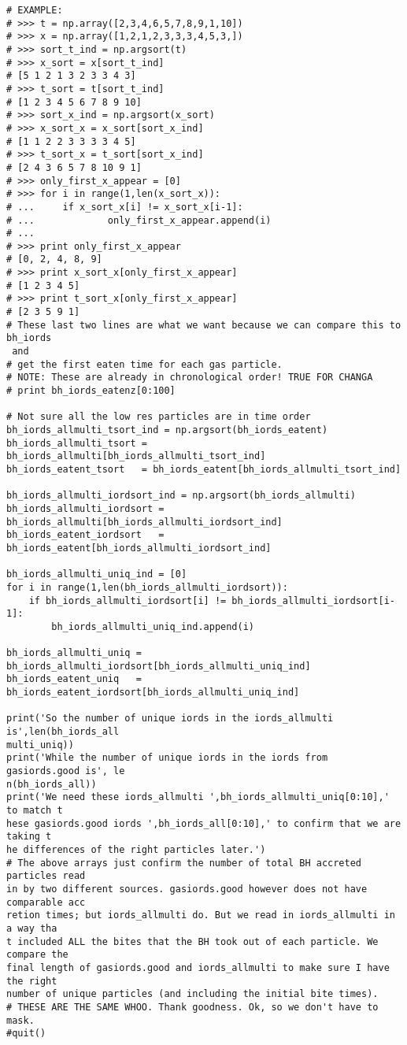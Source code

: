 \documentclass[12pt,headA,chapB]{fiskthesis}
\begin{document}
\begin{verbatim}
# EXAMPLE:
# >>> t = np.array([2,3,4,6,5,7,8,9,1,10])
# >>> x = np.array([1,2,1,2,3,3,3,4,5,3,])
# >>> sort_t_ind = np.argsort(t)
# >>> x_sort = x[sort_t_ind]
# [5 1 2 1 3 2 3 3 4 3]
# >>> t_sort = t[sort_t_ind]
# [1 2 3 4 5 6 7 8 9 10]
# >>> sort_x_ind = np.argsort(x_sort)
# >>> x_sort_x = x_sort[sort_x_ind]
# [1 1 2 2 3 3 3 3 4 5]
# >>> t_sort_x = t_sort[sort_x_ind]
# [2 4 3 6 5 7 8 10 9 1]
# >>> only_first_x_appear = [0]
# >>> for i in range(1,len(x_sort_x)):
# ...     if x_sort_x[i] != x_sort_x[i-1]:
# ...             only_first_x_appear.append(i)
# ... 
# >>> print only_first_x_appear
# [0, 2, 4, 8, 9]
# >>> print x_sort_x[only_first_x_appear]
# [1 2 3 4 5]
# >>> print t_sort_x[only_first_x_appear]
# [2 3 5 9 1]
# These last two lines are what we want because we can compare this to bh_iords
 and 
# get the first eaten time for each gas particle.
# NOTE: These are already in chronological order! TRUE FOR CHANGA
# print bh_iords_eatenz[0:100]

# Not sure all the low res particles are in time order
bh_iords_allmulti_tsort_ind = np.argsort(bh_iords_eatent)
bh_iords_allmulti_tsort = bh_iords_allmulti[bh_iords_allmulti_tsort_ind]
bh_iords_eatent_tsort   = bh_iords_eatent[bh_iords_allmulti_tsort_ind]

bh_iords_allmulti_iordsort_ind = np.argsort(bh_iords_allmulti)
bh_iords_allmulti_iordsort = bh_iords_allmulti[bh_iords_allmulti_iordsort_ind]
bh_iords_eatent_iordsort   = bh_iords_eatent[bh_iords_allmulti_iordsort_ind]

bh_iords_allmulti_uniq_ind = [0]
for i in range(1,len(bh_iords_allmulti_iordsort)):
    if bh_iords_allmulti_iordsort[i] != bh_iords_allmulti_iordsort[i-1]:
        bh_iords_allmulti_uniq_ind.append(i)

bh_iords_allmulti_uniq = bh_iords_allmulti_iordsort[bh_iords_allmulti_uniq_ind]
bh_iords_eatent_uniq   = bh_iords_eatent_iordsort[bh_iords_allmulti_uniq_ind]

print('So the number of unique iords in the iords_allmulti is',len(bh_iords_all
multi_uniq))
print('While the number of unique iords in the iords from gasiords.good is', le
n(bh_iords_all))
print('We need these iords_allmulti ',bh_iords_allmulti_uniq[0:10],' to match t
hese gasiords.good iords ',bh_iords_all[0:10],' to confirm that we are taking t
he differences of the right particles later.')
# The above arrays just confirm the number of total BH accreted particles read 
in by two different sources. gasiords.good however does not have comparable acc
retion times; but iords_allmulti do. But we read in iords_allmulti in a way tha
t included ALL the bites that the BH took out of each particle. We compare the 
final length of gasiords.good and iords_allmulti to make sure I have the right 
number of unique particles (and including the initial bite times).
# THESE ARE THE SAME WHOO. Thank goodness. Ok, so we don't have to mask.
#quit()


\end{verbatim}
\end{document}
